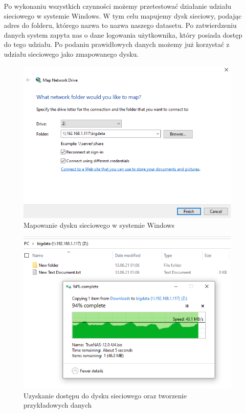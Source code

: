 \documentclass[12pt,a4paper]{article}
\newcommand{\<}{\langle}
\renewcommand{\>}{\rangle}
\theoremstyle{definition}
\begin{document}
Po wykonaniu wszystkich czynności możemy przetestować działanie udziału sieciowego w systemie Windows. W tym celu mapujemy dysk sieciowy, podając adres do folderu, którego nazwa to nazwa naszego datasetu. Po zatwierdzeniu danych system zapyta nas o dane logowania użytkownika, który posiada dostęp do tego udziału. Po podaniu prawidłowych danych możemy już korzystać z udziału sieciowego jako zmapowanego dysku.

\begin{figure}[H]
    \centering
    \includegraphics[width=14cm]{img/ss_truenas/45.png}
    \caption{Mapowanie dysku sieciowego w systemie Windows}
\end{figure}

\begin{figure}[H]
    \centering
    \includegraphics[width=14cm]{img/ss_truenas/50.png}
    \caption{Uzyskanie dostępu do dysku sieciowego oraz tworzenie przykładowych danych}
\end{figure}
\end{document}
